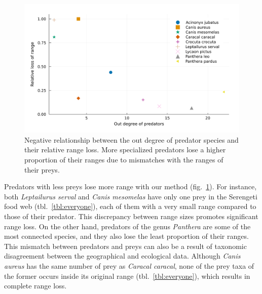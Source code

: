 \documentclass[11pt]{article}
\makeatletter
\def\maxwidth{\ifdim\Gin@nat@width>\linewidth\linewidth
\else\Gin@nat@width\fi}
\let\Oldincludegraphics\includegraphics
\renewcommand{\includegraphics}[1]{\Oldincludegraphics[width=\maxwidth]{#1}}
\makeatother
\begin{document}
\begin{figure}
\hypertarget{fig:degree}{%
\centering
\includegraphics{figures/rel_loss-outdegree-species.png}
\caption{Negative relationship between the out degree of predator
species and their relative range loss. More specialized predators lose a
higher proportion of their ranges due to mismatches with the ranges of
their preys.}\label{fig:degree}
}
\end{figure}

Predators with less preys lose more range with our method
(fig.~\ref{fig:degree}). For instance, both \emph{Leptailurus serval}
and \emph{Canis mesomelas} have only one prey in the Serengeti food web
(tbl.~\ref{tbl:everyone}), each of them with a very small range compared
to those of their predator. This discrepancy between range sizes
promotes significant range loss. On the other hand, predators of the
genus \emph{Panthera} are some of the most connected species, and they
also lose the least proportion of their ranges. This mismatch between
predators and preys can also be a result of taxonomic disagreement
between the geographical and ecological data. Although \emph{Canis
aureus} has the same number of prey as \emph{Caracal caracal}, none of
the prey taxa of the former occurs inside its original range
(tbl.~\ref{tbl:everyone}), which results in complete range loss.
\end{document}
